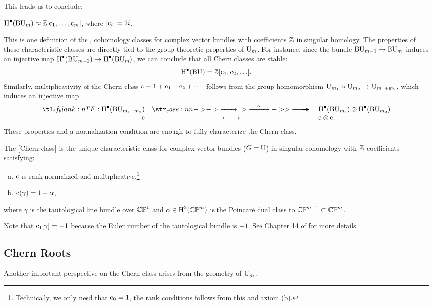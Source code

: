 This leads us to conclude:
\begin{proposition}
	$\operatorname{H}^\bullet(\mathrm{BU}_m)\approx \mathbb{Z}[\mathrm{c}_1,\ldots, \mathrm{c}_m]$, where $|\mathrm{c}_i|=2i$.
\end{proposition}

This is one definition of the , cohomology classes for complex vector bundles with coefficients $\mathbb{Z}$ in singular homology. The properties of these characteristic classes are directly tied to the group theoretic properties of $\mathrm{U}_m$.
For instance, since the bundle $\mathrm{BU}_{m-1} \to \mathrm{BU}_{m}$ induces an injective map $\operatorname{H}^\bullet(\mathrm{BU}_{m-1}) \to \operatorname{H}^\bullet(\mathrm{BU}_m)$, we can conclude that all Chern classes are stable:
\[
	\operatorname{H}^\bullet(\mathrm{BU}) = \mathbb{Z}[\mathrm{c}_1,\mathrm{c}_2,\ldots].
\]
Similarly, multiplicativity of the Chern class $\mathrm{c} = 1+\mathrm{c}_1+\mathrm{c}_2+\cdots$ follows from the group homomorphism $\mathrm{U}_{m_1}\times \mathrm{U}_{m_2} \to \mathrm{U}_{m_1+m_2}$, which induces an injective map 
\[
	\lkxfunc{}{\H^\bullet(\BU_{m_1+m_2})}{\H^\bullet(\BU_{m_1})\otimes \H^\bullet(\BU_{m_2})}{\cl}{\cl \otimes \cl.}
\]
These properties and a normalization condition are enough to fully characterize the Chern class.
\begin{proposition}
	The [Chern class] is the unique characteristic class for complex vector bundles ($G=\mathrm{U}$) in singular cohomology with $\mathbb{Z}$ coefficients satisfying:
	\begin{enumerate}[(a)]
		\item $\mathrm{c}$ is rank-normalized and multiplicative,\footnote{Technically, we only need that $\mathrm{c}_0=1$, the rank conditions follows from this and axiom (b).}
		\item $\mathrm{c}(\gamma)=1-\alpha$,
	\end{enumerate}
	where $\gamma$ is the tautological line bundle over $\mathbb{CP}^1$ and $\alpha\in \operatorname{H}^2(\mathbb{CP}^m)$ is the Poincar\'e dual class to $\mathbb{CP}^{m-1}\subset \mathbb{CP}^m$.
\end{proposition}

Note that $\mathrm{c}_1[\gamma]=-1$ because the Euler number of the tautological bundle is $-1$. See Chapter 14 of \cite{milnorstasheff1974} for more details.

\subsection{Chern Roots}

Another important perspective on the Chern class arises from the geometry of $\mathrm{U}_m$. 

